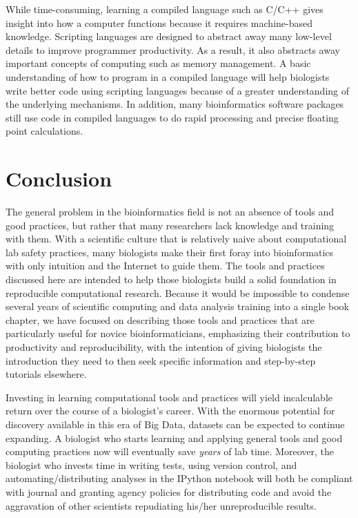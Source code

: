 \documentclass[ChapterTOCs,krantz2]{krantz} %
\begin{document}
While time-consuming, learning a compiled language such as C/C++
gives insight into how a computer functions because it requires 
machine-based knowledge. Scripting languages are designed to abstract 
away many low-level
details to improve programmer productivity. As a result, it also abstracts away
important concepts of computing such as memory management. A basic
understanding of how to program in a compiled language will help biologists
write better code using scripting languages because of a greater understanding
of the underlying mechanisms. In addition, many bioinformatics software
packages still use code in compiled languages to do rapid
processing and precise floating point calculations.  

\section{Conclusion}\label{conclusion}

The general problem in the
bioinformatics field is not an absence of tools and good practices, but rather
that many researchers lack knowledge and training with them\cite{Merali2010}.  With a scientific
culture that is relatively naive about computational lab safety practices, 
many biologists make their
first foray into bioinformatics with only intuition and the Internet to guide
them.  The tools and practices discussed here are intended to help
those biologists build a solid foundation in reproducible computational
research.  Because it would be impossible to condense several years of
scientific computing and data analysis training into a single book chapter, we
have focused on describing those tools and practices that are particularly
useful for novice bioinformaticians, emphasizing their contribution to 
productivity and reproducibility, with the intention of giving biologists the
introduction they need to then seek specific information and step-by-step
tutorials elsewhere. 

Investing in learning computational tools and practices will yield incalculable
return over the course of a biologist's career.  With the enormous potential
for discovery available in this era of Big Data, datasets can be expected to
continue expanding.  A biologist who starts learning and applying general tools
and good computing practices now will eventually save \emph{years} of lab time.
Moreover, the biologist who invests time in writing tests, using version
control, and automating/distributing analyses in the IPython notebook will both
be compliant with journal and granting agency policies for distributing code
and avoid the aggravation of other scientists repudiating his/her
unreproducible results.
\end{document}
